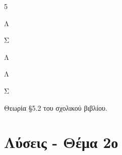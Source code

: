 
\begin{alist}
\item
\begin{multicols}{5}
\begin{rlist}
\item Λ
\item Σ
\item Λ
\item Λ
\item Σ
\end{rlist}
\end{multicols}
\item Θεωρία \S 5.2 του σχολικού βιβλίου.
\end{alist}



\newpage
\section{Λύσεις - Θέμα 2ο}


